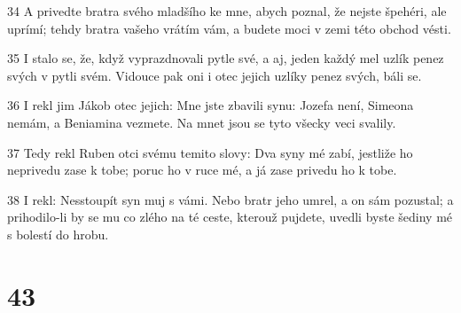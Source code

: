 \par 34 A privedte bratra svého mladšího ke mne, abych poznal, že nejste špehéri, ale uprímí; tehdy bratra vašeho vrátím vám, a budete moci v zemi této obchod vésti.
\par 35 I stalo se, že, když vyprazdnovali pytle své, a aj, jeden každý mel uzlík penez svých v pytli svém. Vidouce pak oni i otec jejich uzlíky penez svých, báli se.
\par 36 I rekl jim Jákob otec jejich: Mne jste zbavili synu: Jozefa není, Simeona nemám, a Beniamina vezmete. Na mnet jsou se tyto všecky veci svalily.
\par 37 Tedy rekl Ruben otci svému temito slovy: Dva syny mé zabí, jestliže ho neprivedu zase k tobe; poruc ho v ruce mé, a já zase privedu ho k tobe.
\par 38 I rekl: Nesstoupít syn muj s vámi. Nebo bratr jeho umrel, a on sám pozustal; a prihodilo-li by se mu co zlého na té ceste, kterouž pujdete, uvedli byste šediny mé s bolestí do hrobu.

\chapter{43}

